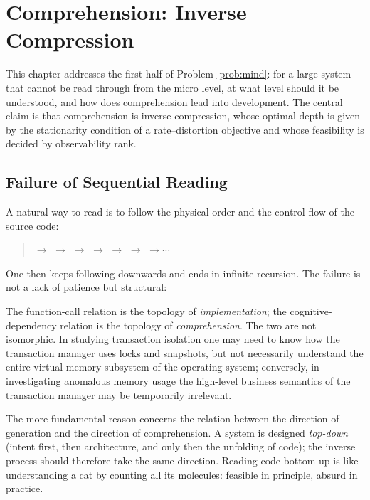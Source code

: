 \chapter{Comprehension: Inverse Compression}\label{ch:comprehension}

This chapter addresses the first half of Problem \ref{prob:mind}: for a large system that
cannot be read through from the micro level, at what level should it be understood, and how
does comprehension lead into development. The central claim is that comprehension is inverse
compression, whose optimal depth is given by the stationarity condition of a rate--distortion
objective and whose feasibility is decided by observability rank.

\section{Failure of Sequential Reading}\label{sec:why-sequential}

A natural way to read is to follow the physical order and the control flow of the source code:

\begin{quote}
 $\to$  $\to$  $\to$
 $\to$  $\to$  $\to$
 $\to \cdots$
\end{quote}

One then keeps following downwards and ends in infinite recursion. The failure is not a lack
of patience but structural:

\begin{principle}\label{pr:call-vs-cog}
The function-call relation is the topology of \emph{implementation}; the cognitive-dependency
relation is the topology of \emph{comprehension}. The two are not isomorphic. In studying
transaction isolation one may need to know how the transaction manager uses locks and
snapshots, but not necessarily understand the entire virtual-memory subsystem of the operating
system; conversely, in investigating anomalous memory usage the high-level business semantics
of the transaction manager may be temporarily irrelevant.
\end{principle}

The more fundamental reason concerns the relation between the direction of generation and the
direction of comprehension. A system is designed \emph{top-down} (intent first, then
architecture, and only then the unfolding of code); the inverse process should therefore take
the same direction. Reading code bottom-up is like understanding a cat by counting all its
molecules: feasible in principle, absurd in practice.

